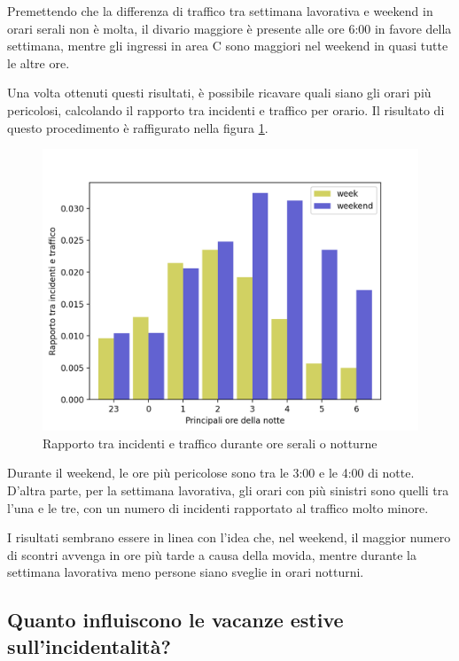 \documentclass[a4paper,12pt]{report}
\begin{document}
Premettendo che la differenza di traffico tra settimana lavorativa e 
weekend in orari serali non è molta, il divario maggiore è presente alle ore 6:00 
in favore della settimana, mentre gli ingressi in area C sono maggiori nel weekend in 
quasi tutte le altre ore.

Una volta ottenuti questi risultati, è possibile ricavare quali siano gli orari
più pericolosi, calcolando il rapporto tra incidenti e traffico per orario.
Il risultato di questo procedimento è 
raffigurato nella figura \ref{fig:rapp-inc-traff}.

\begin{figure}
    \includegraphics[width=\linewidth]{../src/area_c/rapporto_inc_notte.png}
    \caption{Rapporto tra incidenti e traffico durante ore serali o notturne}
    \label{fig:rapp-inc-traff}
\end{figure}

Durante il weekend, le ore più pericolose sono tra le 3:00 e le 4:00 di notte. 
D'altra parte, per la settimana lavorativa, gli orari con più sinistri sono quelli 
tra l'una e le tre, con un numero di incidenti rapportato al 
traffico molto minore. 

I risultati sembrano essere in linea con l'idea che, nel weekend, il maggior 
numero di scontri avvenga in ore più tarde a causa della movida, mentre durante 
la settimana lavorativa meno persone siano sveglie in orari notturni.

\subsection{Quanto influiscono le vacanze estive sull'incidentalità?}
\end{document}
